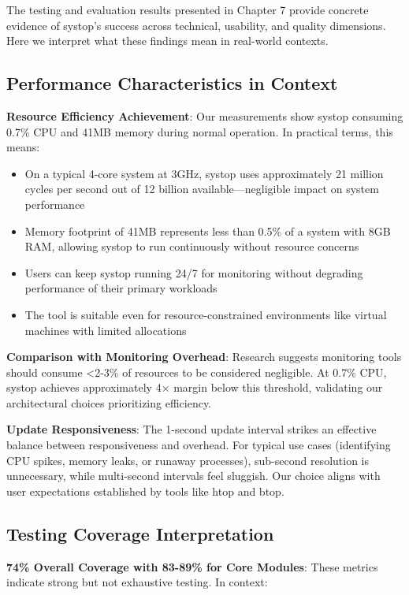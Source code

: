\documentclass[12pt,a4paper,oneside]{report}
\begin{document}
The testing and evaluation results presented in Chapter 7 provide concrete evidence of systop's success across technical, usability, and quality dimensions. Here we interpret what these findings mean in real-world contexts.

\subsection{Performance Characteristics in Context}

\textbf{Resource Efficiency Achievement}: Our measurements show systop consuming 0.7\% CPU and 41MB memory during normal operation. In practical terms, this means:

\begin{itemize}
    \item On a typical 4-core system at 3GHz, systop uses approximately 21 million cycles per second out of 12 billion available---negligible impact on system performance
    \item Memory footprint of 41MB represents less than 0.5\% of a system with 8GB RAM, allowing systop to run continuously without resource concerns
    \item Users can keep systop running 24/7 for monitoring without degrading performance of their primary workloads
    \item The tool is suitable even for resource-constrained environments like virtual machines with limited allocations
\end{itemize}

\textbf{Comparison with Monitoring Overhead}: Research suggests monitoring tools should consume <2-3\% of resources to be considered negligible. At 0.7\% CPU, systop achieves approximately 4× margin below this threshold, validating our architectural choices prioritizing efficiency.

\textbf{Update Responsiveness}: The 1-second update interval strikes an effective balance between responsiveness and overhead. For typical use cases (identifying CPU spikes, memory leaks, or runaway processes), sub-second resolution is unnecessary, while multi-second intervals feel sluggish. Our choice aligns with user expectations established by tools like htop and btop.

\subsection{Testing Coverage Interpretation}

\textbf{74\% Overall Coverage with 83-89\% for Core Modules}: These metrics indicate strong but not exhaustive testing. In context:
\end{document}
